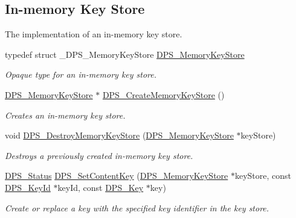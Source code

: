 \subsection*{In-\/memory Key Store}
\label{_amgrp68c1df9ad4ec9d94325f55864c7d7170}%
The implementation of an in-\/memory key store. \begin{DoxyCompactItemize}
\item 
\mbox{\label{group__keystore_ga57f11410b3ef6a686594b60836dc8c99}} 
typedef struct \+\_\+\+D\+P\+S\+\_\+\+Memory\+Key\+Store \hyperlink{group__keystore_ga57f11410b3ef6a686594b60836dc8c99}{D\+P\+S\+\_\+\+Memory\+Key\+Store}
\begin{DoxyCompactList}\small\item\em Opaque type for an in-\/memory key store. \end{DoxyCompactList}\item 
\hyperlink{group__keystore_ga57f11410b3ef6a686594b60836dc8c99}{D\+P\+S\+\_\+\+Memory\+Key\+Store} $\ast$ \hyperlink{group__keystore_ga2da4c5f9b7ab5ff6b65d1c8f4d6c30bc}{D\+P\+S\+\_\+\+Create\+Memory\+Key\+Store} ()
\begin{DoxyCompactList}\small\item\em Creates an in-\/memory key store. \end{DoxyCompactList}\item 
void \hyperlink{group__keystore_ga2f9f4aeff872ca74d5735a8727f4dbae}{D\+P\+S\+\_\+\+Destroy\+Memory\+Key\+Store} (\hyperlink{group__keystore_ga57f11410b3ef6a686594b60836dc8c99}{D\+P\+S\+\_\+\+Memory\+Key\+Store} $\ast$key\+Store)
\begin{DoxyCompactList}\small\item\em Destroys a previously created in-\/memory key store. \end{DoxyCompactList}\item 
\hyperlink{group__status_ga30395a84d3cad9d4ec29848106415038}{D\+P\+S\+\_\+\+Status} \hyperlink{group__keystore_ga1855a8efae53b90fa95aa5b97295c4ec}{D\+P\+S\+\_\+\+Set\+Content\+Key} (\hyperlink{group__keystore_ga57f11410b3ef6a686594b60836dc8c99}{D\+P\+S\+\_\+\+Memory\+Key\+Store} $\ast$key\+Store, const \hyperlink{group__keystore_ga4345e29dd2ad5d7fd88a1e988787bd72}{D\+P\+S\+\_\+\+Key\+Id} $\ast$key\+Id, const \hyperlink{group__keystore_gaa56a1429b6a1658e674eea558bdbbfc0}{D\+P\+S\+\_\+\+Key} $\ast$key)
\begin{DoxyCompactList}\small\item\em Create or replace a key with the specified key identifier in the key store. \end{DoxyCompactList}\item 

\end{DoxyCompactItemize}
